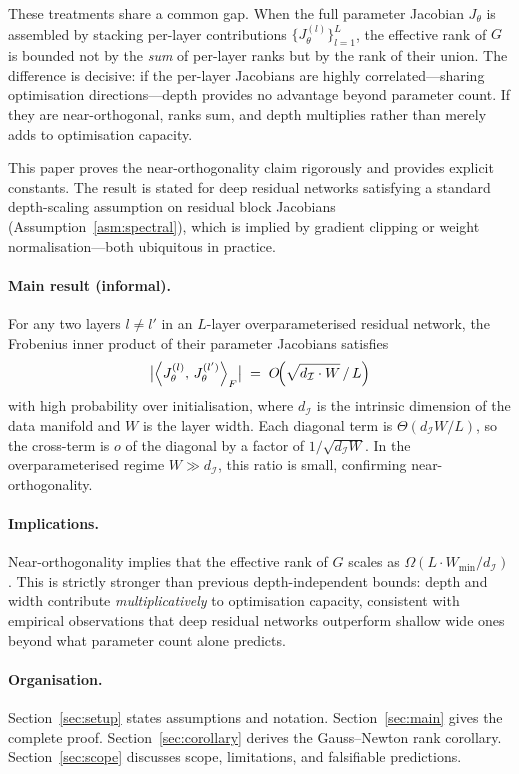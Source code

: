 \documentclass[11pt]{article}
\theoremstyle{plain}
\theoremstyle{definition}
\theoremstyle{remark}
\newcommand{\inner}[2]{\left\langle #1,\, #2 \right\rangle}
\newcommand{\dI}{d_{\mathcal{I}}}
\begin{document}
These treatments share a common gap.  When the full parameter Jacobian
$J_\theta$ is assembled by stacking per-layer contributions
$\{J_\theta^{(l)}\}_{l=1}^{L}$, the effective rank of $G$ is bounded not
by the \emph{sum} of per-layer ranks but by the rank of their union.
The difference is decisive: if the per-layer Jacobians are highly
correlated---sharing optimisation directions---depth provides no advantage
beyond parameter count.  If they are near-orthogonal, ranks sum, and depth
multiplies rather than merely adds to optimisation capacity.

This paper proves the near-orthogonality claim rigorously and provides
explicit constants.  The result is stated for deep residual networks
satisfying a standard depth-scaling assumption on residual block Jacobians
(Assumption~\ref{asm:spectral}), which is implied by gradient clipping or
weight normalisation---both ubiquitous in practice.

\paragraph{Main result (informal).}
For any two layers $l\neq l'$ in an $L$-layer overparameterised residual
network, the Frobenius inner product of their parameter Jacobians satisfies
\[
  \bigl|\inner{J_\theta^{(l)}}{J_\theta^{(l')}}_F\bigr|
  \;=\;
  O\!\Bigl(\sqrt{\dI\cdot W}\,/\,L\Bigr)
\]
with high probability over initialisation, where $\dI$ is the intrinsic
dimension of the data manifold and $W$ is the layer width.  Each diagonal
term is $\Theta(\dI W/L)$, so the cross-term is $o$ of the diagonal by a
factor of $1/\sqrt{\dI W}$.  In the overparameterised regime $W\gg \dI$,
this ratio is small, confirming near-orthogonality.

\paragraph{Implications.}
Near-orthogonality implies that the effective rank of $G$ scales as
$\Omega(L\cdot W_{\min}/\dI)$.  This is strictly stronger than previous
depth-independent bounds: depth and width contribute \emph{multiplicatively}
to optimisation capacity, consistent with empirical observations that deep
residual networks outperform shallow wide ones beyond what parameter count
alone predicts.

\paragraph{Organisation.}
Section~\ref{sec:setup} states assumptions and notation.
Section~\ref{sec:main} gives the complete proof.
Section~\ref{sec:corollary} derives the Gauss--Newton rank corollary.
Section~\ref{sec:scope} discusses scope, limitations, and falsifiable
predictions.
\end{document}
